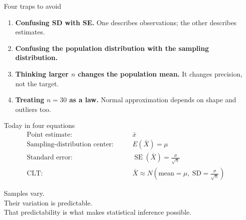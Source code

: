 \documentclass[11pt,aspectratio=169]{beamer}
\newcommand{\SE}{\operatorname{SE}}
\begin{document}
\begin{frame}{Four traps to avoid}
\begin{enumerate}
  \item \textbf{Confusing SD with SE.} One describes observations; the other describes estimates.
  \item \textbf{Confusing the population distribution with the sampling distribution.}
  \item \textbf{Thinking larger $n$ changes the population mean.} It changes precision, not the target.
  \item \textbf{Treating $n=30$ as a law.} Normal approximation depends on shape and outliers too.
\end{enumerate}
\end{frame}

\begin{frame}{Today in four equations}
\begin{align*}
\text{Point estimate:}\qquad & \bar{x} \\[0.4em]
\text{Sampling-distribution center:}\qquad & E(\bar{X})=\mu \\[0.4em]
\text{Standard error:}\qquad & \SE(\bar{X})=\frac{\sigma}{\sqrt{n}} \\[0.4em]
\text{CLT:}\qquad & \bar{X}\approx N\!\left(\text{mean}=\mu,\;\text{SD}=\frac{\sigma}{\sqrt{n}}\right)
\end{align*}
\end{frame}

\begin{frame}[standout]
\Large Samples vary.\\[0.5em]
\Large Their variation is predictable.\\[0.7em]
\normalsize That predictability is what makes statistical inference possible.
\end{frame}
\end{document}
